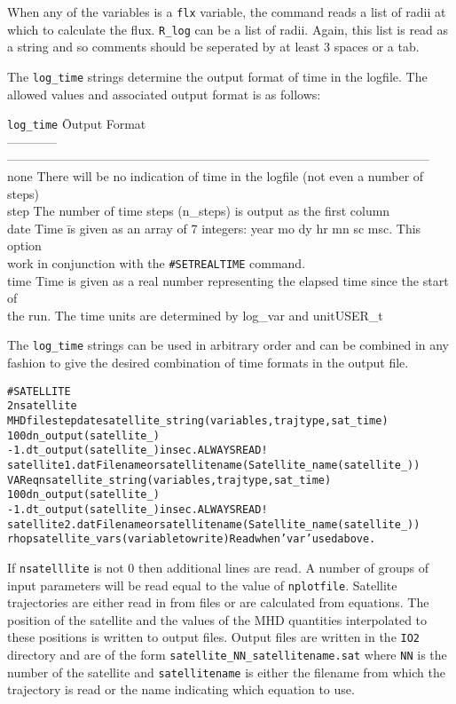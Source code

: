 When any of the variables is a {\tt flx} variable, the command reads a list of 
radii at which to calculate the flux.  {\tt R\_log} can be a list of radii.  Again,
this list is read as a string and so comments should be seperated by at least 3
spaces or a tab. 

The {\tt log\_time} strings determine the output format of time in the logfile.
The allowed values and associated output format is as follows:
\begin{tabbing}
{\tt log\_time}     \hspace{.5in} \=  Output Format \\
------------ \> ------------------------------------------------------------------------------------------------------ \\
none  \> There will be no indication of time in the logfile (not even a 
               number of steps) \\
step  \> The number of time steps (n\_steps) is output as the first column \\
date  \> Time \=is given as an array of 7 integers:  year mo dy hr mn sc msc.  This option \\
      \>      \>work in conjunction with the {\tt \#SETREALTIME} command. \\
time  \> Time is given as a real number representing the  elapsed time since the start of \\
      \>      \>  the run.  The time units are determined by log\_var and unitUSER\_t
\end{tabbing}
The  {\tt log\_time} strings can be used in arbitrary order and can be combined in
any fashion to give the desired combination of time formats in the output file.


\begin{alltt}
#SATELLITE
2                      nsatellite
MHD file step date     satellite_string (variables, traj type, sat_time)
100                    dn_output(satellite_)
-1.                    dt_output(satellite_) in sec. ALWAYS READ!
satellite1.dat         Filename or satellite name (Satellite_name(satellite_))
VAR eqn                satellite_string  (variables, traj type, sat_time)
100                    dn_output(satellite_)
-1.                    dt_output(satellite_) in sec. ALWAYS READ!
satellite2.dat         Filename or satellite name (Satellite_name(satellite_))
rho p                  satellite_vars (variable to write) Read when 'var' used above.
\end{alltt}

If {\tt nsatelllite} is not 0 then additional
lines are read.  A number of groups of input parameters will be read equal
to the value of {\tt nplotfile}.  
Satellite trajectories are either read in from files or are calculated from
equations.  The position of the satellite and the values of the MHD quantities
interpolated to these positions is written to output files.  Output files are 
written in the {\tt IO2} directory and are of
the form {\tt satellite\_NN\_satellitename.sat} where {\tt NN} is the 
number of the satellite and {\tt satellitename} is either the filename
from which the trajectory is read or the name indicating which equation to
use.  

